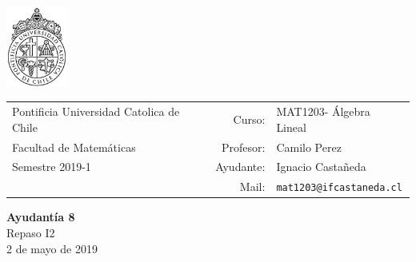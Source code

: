 \documentclass[12pt]{article}
\makeatletter
\newcommand{\ayudantia}{{\sc Ayudantía 8}}
\newcommand{\tituloayu}{Repaso I2}
\newcommand{\fecha}{2 de mayo de 2019}
\newcommand{\sigla}{MAT1203}
\newcommand{\nombre}{Álgebra Lineal}
\newcommand{\profesor}{Camilo Perez}
\newcommand{\ano}{2019}
\newcommand{\semestre}{1}
\newcommand{\mail}{mat1203@ifcastaneda.cl}
\makeatother
\begin{document}
\thispagestyle{empty}

\begin{minipage}{2cm}
	\includegraphics[width=2cm]{../../../../img/logo.pdf}
	\vspace{0.5cm}
\end{minipage}
\begin{minipage}{\linewidth}
	\begin{tabular}{lrl}
		{\scriptsize\sc Pontificia Universidad Catolica de Chile} & \hspace*{0.7in}Curso: &
		\sigla  - \nombre\\
		{\sc Facultad de Matemáticas}&
		Profesor: & \profesor \\
		{\sc Semestre \ano-\semestre} & Ayudante: & {Ignacio Castañeda}\\
		& {Mail:} & \texttt{\mail}
	\end{tabular}
\end{minipage}

\vspace{-10mm}
\begin{center}
	{\LARGE\bf \ayudantia}\\
	\vspace{0.1cm}
	{\tituloayu}\\
	\vspace{0.1cm}
	\fecha\\
	\vspace{0.4cm}
\end{center}
\end{document}
